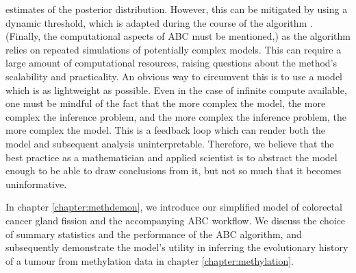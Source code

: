 estimates of the posterior distribution. However, this can be mitigated by using a dynamic threshold, which is
adapted during the course of the algorithm \cite{prangle_adapting_2017}.
(Finally, the computational aspects of ABC must be mentioned,) as the algorithm relies on repeated simulations of
potentially complex models. This can require a large amount of computational resources, raising questions about
the method's scalability and practicality. An obvious way to circumvent this is to use a model which is as
lightweight as possible. Even in the case of infinite compute available, one must be mindful of the fact that
the more complex the model, the more complex the inference problem, and the more complex the inference problem,
the more complex the model. This is a feedback loop which can render both the model and subsequent analysis
uninterpretable. Therefore, we believe that the best practice as a mathematician and applied scientist is to abstract
the model enough to be able to draw conclusions from it, but not so much that it becomes uninformative. \par
In chapter \ref{chapter:methdemon}, we introduce our simplified model of colorectal cancer gland fission and
the accompanying ABC workflow. We discuss the choice of summary statistics and the performance of the ABC
algorithm, and subsequently demonstrate the model's utility in inferring the evolutionary history of a tumour
from methylation data in chapter \ref{chapter:methylation}.


